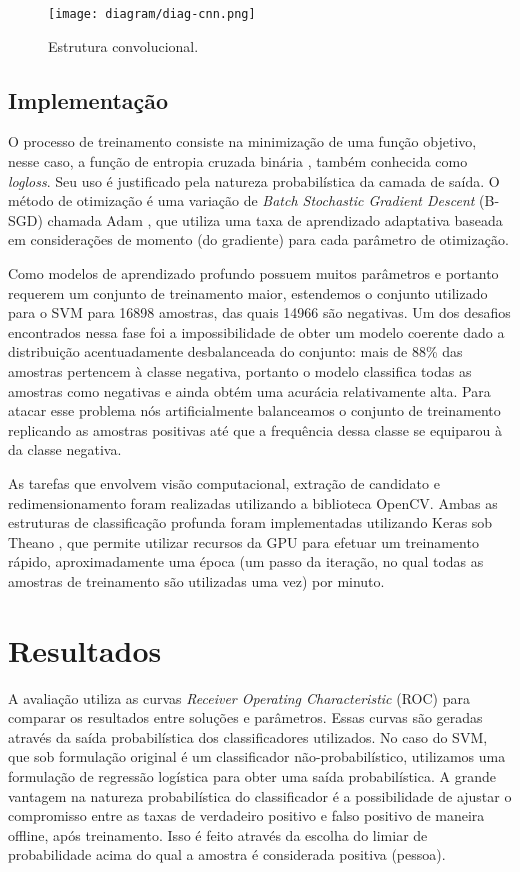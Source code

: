         \begin{figure}
        \centering
        \texttt{[image: diagram/diag-cnn.png]}
        \caption{Estrutura convolucional.}
        \label{fig:diag-cnn}
        \end{figure}

    \subsection{Implementação}
        O processo de treinamento consiste na minimização de uma função objetivo, nesse caso, a função de entropia cruzada binária \cite{DLbook}, também conhecida como \textit{logloss}. Seu uso é justificado pela natureza probabilística da camada de saída. O método de otimização é uma variação de \textit{Batch Stochastic Gradient Descent} (B-SGD) chamada Adam \cite{kingma2014adam}, que utiliza uma taxa de aprendizado adaptativa baseada em considerações de momento (do gradiente) para cada parâmetro de otimização.


        Como modelos de aprendizado profundo possuem muitos parâmetros e portanto requerem um conjunto de treinamento maior, estendemos o conjunto utilizado para o SVM para 16898 amostras, das quais 14966 são negativas. Um dos desafios encontrados nessa fase foi a impossibilidade de obter um modelo coerente dado a distribuição acentuadamente desbalanceada do conjunto: mais de 88\% das amostras pertencem à classe negativa, portanto o modelo classifica todas as amostras como negativas e ainda obtém uma acurácia relativamente alta. Para atacar esse problema nós artificialmente balanceamos o conjunto de treinamento replicando as amostras positivas até que a frequência dessa classe se equiparou à da classe negativa.

        As tarefas que envolvem visão computacional, extração de candidato e redimensionamento foram realizadas utilizando a biblioteca OpenCV. Ambas as estruturas de classificação profunda foram implementadas utilizando Keras \cite{keras} sob Theano \cite{theano}, que permite utilizar recursos da GPU para efetuar um treinamento rápido, aproximadamente uma época (um passo da iteração, no qual todas as amostras de treinamento são utilizadas uma vez) por minuto.

\section{Resultados}
\label{sec:results}

    A avaliação utiliza as curvas \textit{Receiver Operating Characteristic} (ROC) \cite{evaluationMetrics} para comparar os resultados entre soluções e parâmetros. Essas curvas são geradas através da saída probabilística dos classificadores utilizados. No caso do SVM, que sob formulação original é um classificador não-probabilístico, utilizamos uma formulação de regressão logística \cite{svmProbabilisticOutput} para obter uma saída probabilística. A grande vantagem na natureza probabilística do classificador é a possibilidade de ajustar o compromisso entre as taxas de verdadeiro positivo e falso positivo de maneira offline, após treinamento. Isso é feito através da escolha do limiar de probabilidade acima do qual a amostra é considerada positiva (pessoa).


